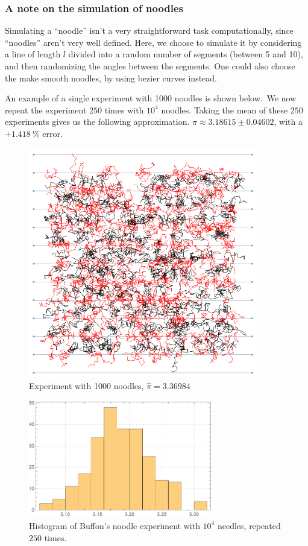 \documentclass[12pt]{article}
\numberwithin{equation}{section}
\begin{document}
\subsubsection{A note on the simulation of noodles}
Simulating a ``noodle'' isn't a very straightforward task computationally, since ``noodles'' aren't very well defined. Here, we choose to simulate it by considering a line of length $l$ divided into a random number of segments (between 5 and 10), and then randomizing the angles between the segments. One could also choose the make smooth noodles, by using bezier curves instead.
\par 
An example of a single experiment with 1000 noodles is shown  below.\
We now repeat the experiment $250$ times with $10^4$ noodles. Taking the mean of these $250$ experiments gives us the following approximation. $\pi \approx 3.18615 \pm 0.04602$, with a $ + 1.418\ \%$ error.
\begin{figure}[!htb]
    \centering
    \includegraphics[width=10cm]{Images/noodleexample.png}
    \caption{Experiment with 1000 noodles, $\widehat{\pi}=3.36984$}
    \label{fig:noodleexample}
\end{figure}\par

\begin{figure}[!htb]
    \centering
    \includegraphics[width=8cm]{Images/repeatednoodle.png}
    \caption{Histogram of Buffon's noodle experiment with $10^4$ needles, repeated $250$ times.}
    \label{fig:repeatednoodle}
\end{figure}
\clearpage
\end{document}

